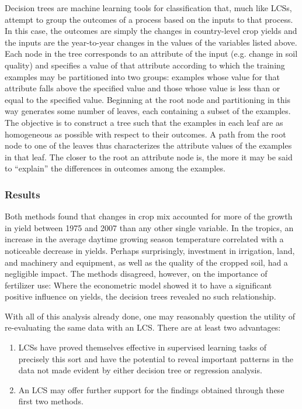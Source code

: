 \documentclass[12pt]{article}
\begin{document}
Decision trees are machine learning tools for classification that, much like LCSs, attempt to group the outcomes of a process based on the inputs to that process. In this case, the outcomes are simply the changes in country-level crop yields and the inputs are the year-to-year changes in the values of the variables listed above. Each node in the tree corresponds to an attribute of the input (e.g. change in soil quality) and specifies a value of that attribute according to which the training examples may be partitioned into two groups: examples whose value for that attribute falls above the specified value and those whose value is less than or equal to the specified value. Beginning at the root node and partitioning in this way generates some number of leaves, each containing a subset of the examples. The objective is to construct a tree such that the examples in each leaf are as homogeneous as possible with respect to their outcomes. A path from the root node to one of the leaves thus characterizes the attribute values of the examples in that leaf. The closer to the root an attribute node is, the more it may be said to ``explain'' the differences in outcomes among the examples.

\subsubsection{Results}
Both methods found that changes in crop mix accounted for more of the growth in yield between 1975 and 2007 than any other single variable. In the tropics, an increase in the average daytime growing season temperature correlated with a noticeable decrease in yields. Perhaps surprisingly, investment in irrigation, land, and machinery and equipment, as well as the quality of the cropped soil, had a negligible impact. The methods disagreed, however, on the importance of fertilizer use: Where the econometric model showed it to have a significant positive influence on yields, the decision trees revealed no such relationship.

With all of this analysis already done, one may reasonably question the utility of re-evaluating the same data with an LCS. There are at least two advantages:

\begin{enumerate}
\item LCSs have proved themselves effective in supervised learning tasks of precisely this sort and have the potential to reveal important patterns in the data not made evident by either decision tree or regression analysis.
\item An LCS may offer further support for the findings obtained through these first two methods.
\end{enumerate}
\end{document}
